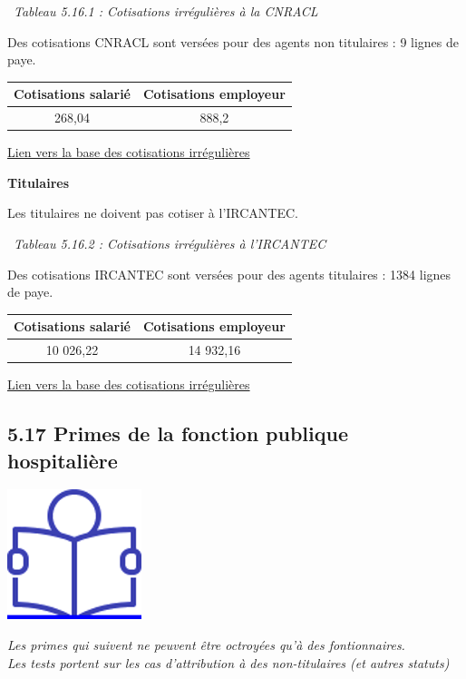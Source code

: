 ~\emph{Tableau 5.16.1 : Cotisations irrégulières à la CNRACL}

Des cotisations CNRACL sont versées pour des agents non titulaires : 9
lignes de paye.

\begin{longtable}[]{@{}cc@{}}
\toprule
Cotisations salarié & Cotisations employeur\tabularnewline
\midrule
\endhead
268,04 & 888,2\tabularnewline
\bottomrule
\end{longtable}

\href{../Bases/Reglementation/Cotisations.irreg.csv}{Lien vers la base des
cotisations irrégulières}

\textbf{Titulaires}

Les titulaires ne doivent pas cotiser à l'IRCANTEC.

~\emph{Tableau 5.16.2 : Cotisations irrégulières à l'IRCANTEC}

Des cotisations IRCANTEC sont versées pour des agents titulaires : 1384
lignes de paye.

\begin{longtable}[]{@{}cc@{}}
\toprule
Cotisations salarié & Cotisations employeur\tabularnewline
\midrule
\endhead
10 026,22 & 14 932,16\tabularnewline
\bottomrule
\end{longtable}

\href{../Bases/Reglementation/Cotisations.irreg.ircantec.csv}{Lien vers la
base des cotisations irrégulières}

\hypertarget{primes-de-la-fonction-publique-hospitaliere}{%
\subsection{5.17 Primes de la fonction publique
hospitalière}\label{primes-de-la-fonction-publique-hospitaliere}}

\href{../Docs/Notices/fiche_FPH.odt}{\includegraphics{icones/Notice.png}}

\emph{Les primes qui suivent ne peuvent être octroyées qu'à des
fontionnaires.}\\
\emph{Les tests portent sur les cas d'attribution à des non-titulaires
(et autres statuts)}


